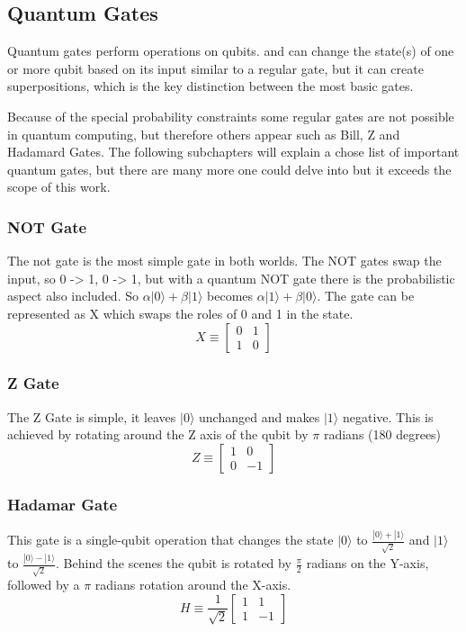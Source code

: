 \documentclass{report}
\begin{document}
\cite{cam}
\cite{fisica}

\subsection{Quantum Gates}
Quantum gates perform operations on qubits. and  can change the state(s) of one or more qubit based on its input similar to a regular gate, but it can create superpositions, which is the key distinction between the most basic gates.

Because of the special probability constraints some regular gates are not possible in quantum computing, but therefore others appear such as Bill, Z and Hadamard Gates. The following subchapters will explain a chose list of important quantum gates, but there are many more one could delve into but it exceeds the scope of this work.

\cite{wikipediaQuantumLogic}
\cite{microsoftIntroductionQuantum2}

\subsubsection{NOT Gate}
The not gate is the most simple gate in both worlds. The NOT gates swap the input, so 0 -> 1, 0 -> 1, but with a quantum NOT gate there is the probabilistic aspect also included. 
So \(\alpha |0\rangle + \beta |1 \rangle\) becomes \(\alpha |1\rangle + \beta | 0 \rangle\). The gate can be represented as X which swaps the roles of 0 and 1 in the state.
\[X \equiv \begin{bmatrix}
    0 & 1\\
    1 & 0
\end{bmatrix}\]
\cite{pennylaneWhatQuantum}

\subsubsection{Z Gate}
The Z Gate is simple, it leaves \(|0\rangle\) unchanged and makes  \(|1\rangle\) negative. This is achieved by rotating around the Z axis of the qubit by \(\pi\) radians (180 degrees)
\[Z \equiv \begin{bmatrix}
    1 & 0\\
    0 & -1
\end{bmatrix}\]
\cite{quantumcomputingukIntroductionQuantum}
\cite{microsoftBeginnersGuide}

\subsubsection{Hadamar Gate}
This gate is a single-qubit operation that changes the state \(|0\rangle\) to \(\frac{|0\rangle + |1\rangle}{\sqrt{2}}\) and \(|1\rangle\) to \(\frac{|0\rangle - |1\rangle}{\sqrt{2}}\). Behind the scenes the qubit is rotated by \(\frac{\pi}{2}\) radians on the Y-axis, followed by a \(\pi\) radians rotation around the X-axis.
\[H \equiv \frac{1}{\sqrt{2}}\begin{bmatrix}
    1 & 1\\
    1 & -1
\end{bmatrix}\]
\cite{microsoftBeginnersGuide}
\cite{quantuminspireHadamardGate}
\end{document}
